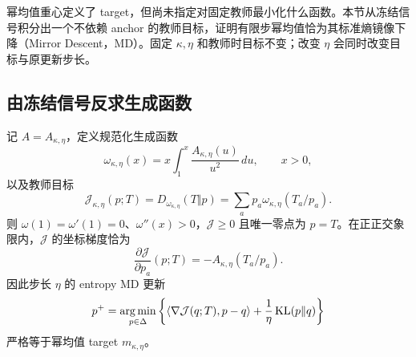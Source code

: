 \label{sec:proximal-md-objective}

幂均值重心定义了 target，但尚未指定对固定教师最小化什么函数。本节从冻结信号积分出一个不依赖 anchor 的教师目标，证明有限步幂均值恰为其标准熵镜像下降（Mirror Descent，MD）。固定 $\kappa,\eta$ 和教师时目标不变；改变 $\eta$ 会同时改变目标与原更新步长。

\subsection{由冻结信号反求生成函数}

\begin{theorem}[幂均值信号的可积性与精确 MD 目标]
\label{thm:power-md-integrable-objective}
记 $A=A_{\kappa,\eta}$，定义规范化生成函数
\begin{equation}
 \omega_{\kappa,\eta}(x)
 =x\int_1^x\frac{A_{\kappa,\eta}(u)}{u^2}\,du,
 \qquad x>0,
 \label{eq:power-md-generator-integral}
\end{equation}
以及教师目标
\begin{equation}
 \mathcal J_{\kappa,\eta}(p;T)
 =D_{\omega_{\kappa,\eta}}(T\Vert p)
 =\sum_a p_a\omega_{\kappa,\eta}(T_a/p_a).
 \label{eq:power-md-fixed-objective}
\end{equation}
则 $\omega(1)=\omega'(1)=0$、$\omega''(x)>0$，$\mathcal J\ge0$ 且唯一零点为 $p=T$。在正正交象限内，$\mathcal J$ 的坐标梯度恰为
\begin{equation}
 \frac{\partial\mathcal J}{\partial p_a}(p;T)
 =-A_{\kappa,\eta}(T_a/p_a).
 \label{eq:power-md-exact-gradient}
\end{equation}
因此步长 $\eta$ 的 entropy MD 更新
\begin{equation}
 p^+=\operatorname*{arg\,min}_{p\in\Delta}
 \left\{\langle\nabla\mathcal J(q;T),p-q\rangle
       +\frac1\eta\operatorname{KL}(p\Vert q)\right\}
 \label{eq:power-md-exact-step}
\end{equation}
严格等于幂均值 target $m_{\kappa,\eta}$。
\end{theorem}


